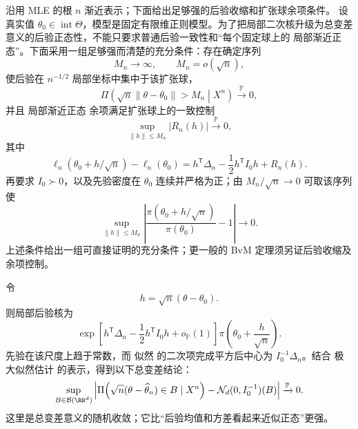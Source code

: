 \begin{theorem}
沿用 MLE 的根 $n$ 渐近表示；下面给出足够强的后验收缩和扩张球余项条件。
设真实值 $\theta_0\in\operatorname{int}\Theta$，模型是固定有限维正则模型。为了把局部二次核升级为总变差意义的后验正态性，不能只要求普通后验一致性和“每个固定球上的 局部渐近正态”。下面采用一组足够强而清楚的充分条件：存在确定序列
\[
 M_n\to\infty,
 \qquad
 M_n=o(\sqrt n),
\]
使后验在 $n^{-1/2}$ 局部坐标中集中于该扩张球，
\begin{equation*}\Pi\!\left(
 \sqrt n\|\theta-\theta_0\|>M_n
 \middle|X^n
 \right)\xrightarrow{\mathbb P}0,
\end{equation*}
并且 局部渐近正态 余项满足扩张球上的一致控制
\[
 \sup_{\|h\|\le M_n}|R_n(h)|\xrightarrow{\mathbb P}0,
\]
其中
\[
 \ell_n(\theta_0+h/\sqrt n)-\ell_n(\theta_0)
 =h^{\mathsf T}\Delta_n-
 \frac12h^{\mathsf T}I_0h+R_n(h).
\]
再要求 $I_0\succ0$，以及先验密度在 $\theta_0$ 连续并严格为正；由 $M_n/\sqrt n\to0$ 可取该序列使
\[
 \sup_{\|h\|\le M_n}
 \left|
 \frac{\pi(\theta_0+h/\sqrt n)}{\pi(\theta_0)}-1
 \right|\to0.
\]
上述条件给出一组可直接证明的充分条件；更一般的 BvM 定理须另证后验收缩及余项控制。

令
\[
 h=\sqrt n(\theta-\theta_0).
\]
则局部后验核为
\[
 \exp\!\left[
 h^{\mathsf T}\Delta_n
 -\frac12h^{\mathsf T}I_0h
 +o_{\mathbb P}(1)
 \right]
 \pi\!\left(\theta_0+\frac h{\sqrt n}\right).
\]
先验在该尺度上趋于常数，而 似然 的二次项完成平方后中心为 $I_0^{-1}\Delta_n$。结合 极大似然估计 的表示，得到以下总变差结论：
\begin{equation}\label{eq:math-stat-bvm-local}
 \sup_{B\in\mathcal B(\RR^d)}
 \left|
 \Pi\!\left(
 \sqrt n(\theta-\widehat\theta_n)\in B
 \mid X^n
 \right)
 -\mathcal N_d(0,I_0^{-1})(B)
 \right|
 \xrightarrow{\mathbb P}0.
\end{equation}
这里是总变差意义的随机收敛；它比“后验均值和方差看起来近似正态”更强。
\end{theorem}


